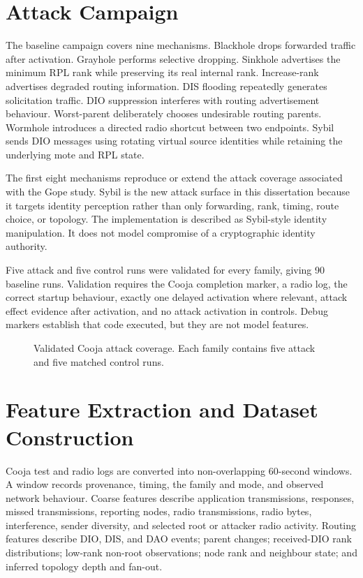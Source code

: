 \section{Attack Campaign}

The baseline campaign covers nine mechanisms. Blackhole drops forwarded traffic after activation. Grayhole performs selective dropping. Sinkhole advertises the minimum RPL rank while preserving its real internal rank. Increase-rank advertises degraded routing information. DIS flooding repeatedly generates solicitation traffic. DIO suppression interferes with routing advertisement behaviour. Worst-parent deliberately chooses undesirable routing parents. Wormhole introduces a directed radio shortcut between two endpoints. Sybil sends DIO messages using rotating virtual source identities while retaining the underlying mote and RPL state.

The first eight mechanisms reproduce or extend the attack coverage associated with the Gope study. Sybil is the new attack surface in this dissertation because it targets identity perception rather than only forwarding, rank, timing, route choice, or topology. The implementation is described as Sybil-style identity manipulation. It does not model compromise of a cryptographic identity authority.

Five attack and five control runs were validated for every family, giving 90 baseline runs. Validation requires the Cooja completion marker, a radio log, the correct startup behaviour, exactly one delayed activation where relevant, attack effect evidence after activation, and no attack activation in controls. Debug markers establish that code executed, but they are not model features.

\begin{figure}[H]
\centering

\caption{Validated Cooja attack coverage. Each family contains five attack and five matched control runs.}
\label{fig:attack-coverage}
\end{figure}

\section{Feature Extraction and Dataset Construction}

Cooja test and radio logs are converted into non-overlapping 60-second windows. A window records provenance, timing, the family and mode, and observed network behaviour. Coarse features describe application transmissions, responses, missed transmissions, reporting nodes, radio transmissions, radio bytes, interference, sender diversity, and selected root or attacker radio activity. Routing features describe DIO, DIS, and DAO events; parent changes; received-DIO rank distributions; low-rank non-root observations; node rank and neighbour state; and inferred topology depth and fan-out.

